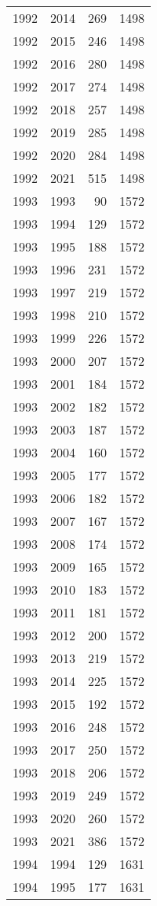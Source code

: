 \documentclass[
  10pt,
  letterpaper,
  DIV=11,
  numbers=noendperiod,
  twoside]{scrartcl}
\begin{document}
\begin{longtable}[]{@{}rrrr@{}}
1992 & 2014 & 269 & 1498 \\
1992 & 2015 & 246 & 1498 \\
1992 & 2016 & 280 & 1498 \\
1992 & 2017 & 274 & 1498 \\
1992 & 2018 & 257 & 1498 \\
1992 & 2019 & 285 & 1498 \\
1992 & 2020 & 284 & 1498 \\
1992 & 2021 & 515 & 1498 \\
1993 & 1993 & 90 & 1572 \\
1993 & 1994 & 129 & 1572 \\
1993 & 1995 & 188 & 1572 \\
1993 & 1996 & 231 & 1572 \\
1993 & 1997 & 219 & 1572 \\
1993 & 1998 & 210 & 1572 \\
1993 & 1999 & 226 & 1572 \\
1993 & 2000 & 207 & 1572 \\
1993 & 2001 & 184 & 1572 \\
1993 & 2002 & 182 & 1572 \\
1993 & 2003 & 187 & 1572 \\
1993 & 2004 & 160 & 1572 \\
1993 & 2005 & 177 & 1572 \\
1993 & 2006 & 182 & 1572 \\
1993 & 2007 & 167 & 1572 \\
1993 & 2008 & 174 & 1572 \\
1993 & 2009 & 165 & 1572 \\
1993 & 2010 & 183 & 1572 \\
1993 & 2011 & 181 & 1572 \\
1993 & 2012 & 200 & 1572 \\
1993 & 2013 & 219 & 1572 \\
1993 & 2014 & 225 & 1572 \\
1993 & 2015 & 192 & 1572 \\
1993 & 2016 & 248 & 1572 \\
1993 & 2017 & 250 & 1572 \\
1993 & 2018 & 206 & 1572 \\
1993 & 2019 & 249 & 1572 \\
1993 & 2020 & 260 & 1572 \\
1993 & 2021 & 386 & 1572 \\
1994 & 1994 & 129 & 1631 \\
1994 & 1995 & 177 & 1631 \\

\end{longtable}
\end{document}
